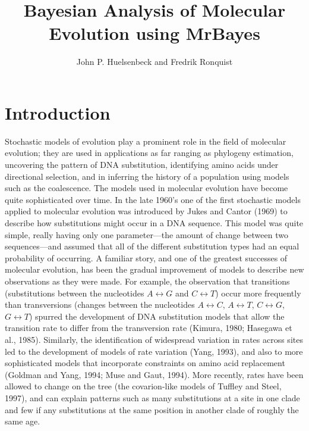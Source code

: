 \documentclass{svmult}
\begin{document}
\title*{Bayesian Analysis of Molecular Evolution using {MrBayes}}

\author{John P. Huelsenbeck and Fredrik Ronquist}


\maketitle

\section{Introduction}
\label{intro.sec}

Stochastic models of evolution play a prominent role in the field of molecular evolution;
they are used in applications as far ranging as phylogeny estimation, uncovering the pattern of DNA
substitution, identifying amino acids under directional selection, and in inferring the history of a
population using models such as the coalescence. The models used in molecular evolution have become
quite sophisticated over time. In the late 1960's one of the first stochastic models applied to
molecular evolution was introduced by Jukes and Cantor (1969) to describe how substitutions might occur
in a DNA sequence. This model was quite simple, really having only one parameter---the amount of
change between two sequences---and assumed that all of the different substitution types had an
equal probability of occurring. A familiar story, and one of the greatest successes of molecular
evolution, has been the gradual improvement of models to describe new observations as they
were made. For example, the observation that transitions (substitutions between the nucleotides
$A \leftrightarrow G$ and $C \leftrightarrow T$) occur more frequently than transversions
(changes between the nucleotides $A \leftrightarrow C$, $A \leftrightarrow T$,
$C \leftrightarrow G$, $G \leftrightarrow T$) spurred the development of DNA substitution
models that allow the transition rate to differ from the transversion rate (Kimura, 1980; Hasegawa et
al., 1985). Similarly, the identification of widespread variation in rates across sites led to the
development of  models of rate variation (Yang, 1993), and also to more sophisticated models
that incorporate constraints on amino acid replacement (Goldman and Yang, 1994; Muse and Gaut, 1994).
More recently, rates have been allowed to change on the tree (the covarion-like models of Tuffley and
Steel, 1997), and can explain patterns such as many substitutions at a site in one clade and few if
any substitutions at the same position in another clade of roughly the same age.
\end{document}
